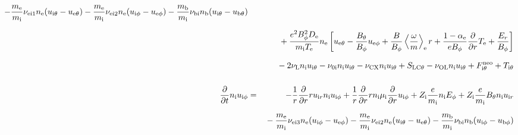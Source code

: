 \documentclass[11pt]{article}
\def\r#1{{\rm#1}}
\def\ddt{\frac{\partial}{\partial t}}
\def\ddr{\frac{\partial}{\partial r}}
\def\ave#1{\left\langle#1\right\rangle}
\def\me{m_\r{e}}
\def\mi{m_\r{i}}
\def\mb{m_\r{b}}
\def\mue{\mu_\r{e}}
\def\mui{\mu_\r{i}}
\def\De{D_\r{e}}
\def\Di{D_\r{i}}
\def\nee{n_\r{e}}
\def\ni{n_\r{i}}
\def\nb{n_\r{b}}
\def\uir{u_{\r{i}r}}
\def\ueth{u_{\r{e}\theta}}
\def\uith{u_{\r{i}\theta}}
\def\ubth{u_{\r{b}\theta}}
\def\ueph{u_{\r{e}\phi}}
\def\uiph{u_{\r{i}\phi}}
\def\ubph{u_{\r{b}\phi}}
\def\Er{E_r}
\def\Eph{E_\phi}
\def\Bth{B_\theta}
\def\Bph{B_\phi}
\def\Te{T_\r{e}}
\def\Ti{T_\r{i}}
\def\Zi{Z_\r{i}}
\def\nubi{\nu_\r{bi}}
\def\nuni{\nu_\r{0i}}
\def\nuL{\nu_\r{L}}
\def\nuCX{\nu_\r{CX}}
\def\nuOL{\nu_\r{OL}}
\newcommand{\Frac}[2]{%
  {\displaystyle {\displaystyle #1\over \displaystyle #2}}%
}
\newcommand{\rdprd}[2]{\Frac{\partial #1}{\partial #2}}
\newcommand{\aveaveB}[1]{\left< \!\! \left< #1 \right> \!\! \right>}
\begin{document}
\begin{eqnarray}
%
  - \frac{\me}{\mi} \nu_\r{ei1} \nee (\uith - \ueth)
%
  - \frac{\me}{\mi} \nu_\r{ei2} \nee (\uiph - \ueph)
%
  - \frac{\mb}{\mi} \nubi \nb (\uith - \ubth)
\nonumber\\[2.5mm]&&{}
%
%
  + \frac{e^2 \Bph^2 \De}{\mi\Te}\nee
    \left[\ueth - \frac{\Bth}{\Bph}\ueph
     + \frac{B}{\Bph}\ave{\frac{\omega}{m}}_\r{e} r
     + \frac{1-\alpha_\r{e}}{e\Bph}\ddr \Te + \frac{\Er}{\Bph}\right]
%
%
\nonumber\\[2.5mm]&&{}
%
  - 2 \nuL \ni \uith
%
  - \nuni \ni \uith
%
  - \nuCX \ni \uith
%
  + S_\r{LC\theta}
%
  - \nuOL \ni \uith
%
%
%
%
  + F_{\r{i}\theta}^\r{neo}
%
  + T_{\r{i}\theta}
\\[5mm]
  \ddt \ni \uiph &=&
%
  - \frac{1}{r} \ddr r \uir \ni \uiph
%
  + \frac{1}{r} \ddr r \ni \mui \ddr \uiph
%
  + \Zi \frac{e}{\mi} \ni \Eph
%
  + \Zi \frac{e}{\mi} \Bth \ni \uir 
\nonumber\\[2.5mm]&&{}
%
  - \frac{\me}{\mi} \nu_\r{ei3} \nee (\uiph - \ueph)
%
  - \frac{\me}{\mi} \nu_\r{ei2} \nee (\uith - \ueth)
%
  - \frac{\mb}{\mi} \nubi \nb (\uiph - \ubph)
\nonumber\\[2.5mm]&&{}

\end{eqnarray}
\end{document}
